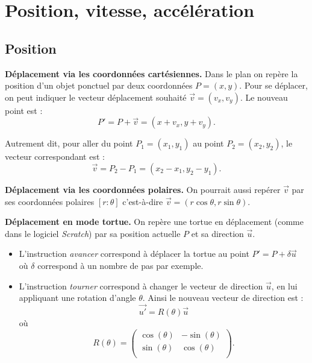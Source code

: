 \documentclass[11pt,class=report,crop=false]{standalone}
\begin{document}








\section{Position, vitesse, accélération}

\subsection{Position}

\textbf{Déplacement via les coordonnées cartésiennes.}
Dans le plan on repère la position d'un objet ponctuel par deux coordonnées $P = (x,y)$.
Pour se déplacer, on peut indiquer le vecteur déplacement souhaité $\vec v = (v_x,v_y)$.
Le nouveau point est :
$$P' = P + \vec{v} = (x+v_x, y + v_y).$$

	
Autrement dit, pour aller du point $P_1 = (x_1,y_1)$ au point $P_2 = (x_2,y_2)$, le vecteur correspondant est :
$$\vec v  = P_2 - P_1 = (x_2-x_1, y_2-y_1).$$


\textbf{Déplacement via les coordonnées polaires.} 
On pourrait aussi repérer $\vec v$ par ses coordonnées polaires $[r:\theta]$ c'est-à-dire
$\vec v  = (r\cos \theta, r\sin\theta)$.


\textbf{Déplacement en mode \og{}tortue\fg{}.} 
On repère une tortue en déplacement (comme dans le logiciel \emph{Scratch}) par sa position actuelle $P$ et sa direction $\vec u$.
\begin{itemize}
	\item L'instruction \emph{avancer} correspond à déplacer la tortue au point $P' = P  + \delta \vec u$ où $\delta$ correspond à un nombre de pas par exemple.

    \item L'instruction \emph{tourner} correspond à changer le vecteur de direction $\vec u$, en lui appliquant une rotation d'angle $\theta$.
    Ainsi le nouveau vecteur de direction est :    
    $$\vec{u'} = R(\theta) \vec{u}$$
    où
    $$R(\theta) = 
    \begin{pmatrix}
    	\cos(\theta) & - \sin(\theta) \\
    	\sin(\theta) & \cos(\theta) \\
    \end{pmatrix}.
    $$
\end{itemize}
\end{document}
